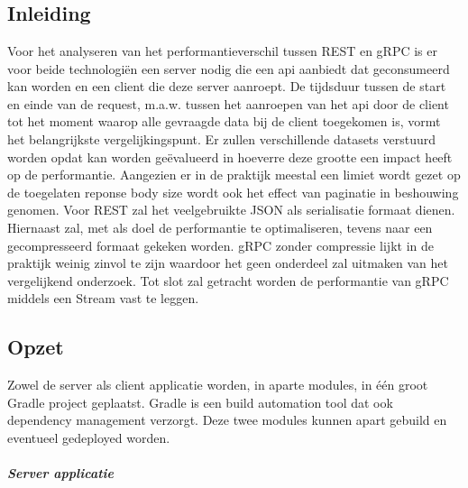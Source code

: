
\chapter{}%
\label{ch:methodologie}

\section{Inleiding}

Voor het analyseren van het performantieverschil tussen REST en gRPC is er voor beide technologi\"en een server nodig die een api aanbiedt dat geconsumeerd kan worden en
een client die deze server aanroept.
De tijdsduur tussen de start en einde van de request, m.a.w. tussen het aanroepen van het api door de client
tot het moment waarop alle gevraagde data bij de client toegekomen is, vormt het belangrijkste vergelijkingspunt.
Er zullen verschillende datasets verstuurd worden opdat kan worden ge\"evalueerd in hoeverre deze grootte een impact heeft op de performantie.
Aangezien er in de praktijk meestal een limiet wordt gezet op de toegelaten reponse body size wordt ook het effect van paginatie in beshouwing genomen.
Voor REST zal het veelgebruikte JSON als serialisatie formaat dienen. Hiernaast zal, met als doel de performantie te optimaliseren,
tevens naar een gecompresseerd formaat gekeken worden. gRPC zonder compressie lijkt in de praktijk weinig zinvol te zijn waardoor het geen onderdeel
zal uitmaken van het vergelijkend onderzoek. Tot slot zal getracht worden de performantie van gRPC middels een Stream vast te leggen.\\

\section{Opzet}

Zowel de server als client applicatie worden, in aparte modules, in één groot Gradle project geplaatst.
Gradle is een build automation tool dat ook dependency management verzorgt. Deze twee modules kunnen apart gebuild en eventueel gedeployed worden.\newline
~\autocite{Gradle}

\paragraph{Server applicatie}

